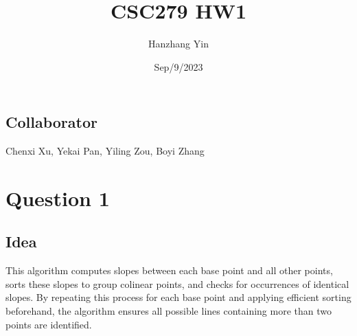 \documentclass{article}
\title{CSC279 HW1}
\author{Hanzhang Yin}
\date{Sep/9/2023}
\begin{document}
\maketitle

\subsection*{Collaborator}
Chenxi Xu, Yekai Pan, Yiling Zou, Boyi Zhang

\section*{Question 1}

\subsection*{Idea}
This algorithm computes slopes between each base point and all other points, sorts these slopes to group colinear points, and checks for occurrences of identical slopes. By repeating this process for each base point and applying efficient sorting beforehand, the algorithm ensures all possible lines containing more than two points are identified.
\end{document}
